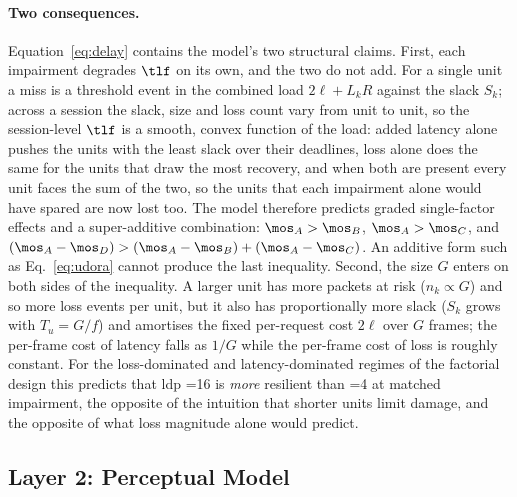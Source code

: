 \paragraph{Two consequences.}
Equation~\eqref{eq:delay} contains the model's two structural claims.
First, each impairment degrades $\tlf$ on its own, and the two do not
add. For a single unit a miss is a threshold event in the combined
load $2\ell + L_k R$ against the slack $S_k$; across a session the
slack, size and loss count vary from unit to unit, so the
session-level $\tlf$ is a smooth, convex function of the load: added
latency alone pushes the units with the least slack over their
deadlines, loss alone does the same for the units that draw the most
recovery, and when both are present every unit faces the sum of the
two, so the units that each impairment alone would have spared are
now lost too. The model therefore predicts graded single-factor
effects and a super-additive combination: $\mos_A > \mos_B$,
$\mos_A > \mos_C$, and $(\mos_A - \mos_D) > (\mos_A - \mos_B) +
(\mos_A - \mos_C)$. An additive form such as Eq.~\eqref{eq:udora}
cannot produce the last inequality.
Second, the \gof size $G$ enters on both sides of the inequality. A
larger unit has more packets at risk ($n_k \propto G$) and so more loss
events per unit, but it also has proportionally more slack ($S_k$
grows with $T_u = G/f$) and amortises the fixed per-request cost
$2\ell$ over $G$ frames; the per-frame cost of latency falls as $1/G$
while the per-frame cost of loss is roughly constant. For the
loss-dominated and latency-dominated regimes of the factorial design
this predicts that \gls{ldp} \gof{}=16 is \emph{more} resilient than
\gof{}=4 at matched impairment, the opposite of the intuition that
shorter units limit damage, and the opposite of what loss magnitude
alone would predict.

\subsection{Layer 2: Perceptual Model}
\label{sec:model-layer2}


